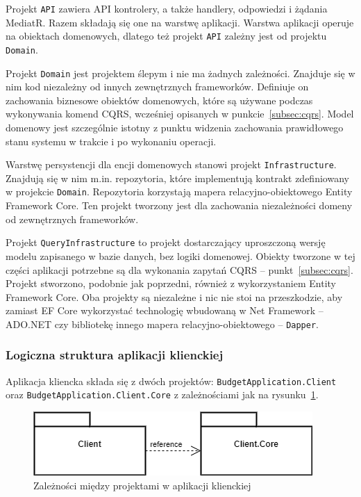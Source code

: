 Projekt \texttt{API} zawiera API kontrolery, a także handlery, odpowiedzi i żądania MediatR. Razem składają się one na warstwę aplikacji. Warstwa aplikacji operuje na obiektach domenowych, dlatego też projekt \texttt{API} zależny jest od projektu \texttt{Domain}.

Projekt \texttt{Domain} jest projektem ślepym i nie ma żadnych zależności. Znajduje się w nim kod niezależny od innych zewnętrznych frameworków. Definiuje on zachowania biznesowe obiektów domenowych, które są używane podczas wykonywania komend CQRS, wcześniej opisanych w punkcie~\ref{subsec:cqrs}. Model domenowy jest szczególnie istotny z punktu widzenia zachowania prawidłowego stanu systemu w trakcie i po wykonaniu operacji.

Warstwę persystencji dla encji domenowych stanowi projekt \texttt{Infrastructure}. Znajdują się w nim m.in. repozytoria, które implementują kontrakt zdefiniowany w projekcie \texttt{Domain}. Repozytoria korzystają mapera relacyjno-obiektowego Entity Framework Core. Ten projekt tworzony jest dla zachowania niezależności domeny od zewnętrznych frameworków.

Projekt \texttt{QueryInfrastructure} to projekt dostarczający uproszczoną wersję modelu zapisanego w bazie danych, bez logiki domenowej. Obiekty tworzone w tej części aplikacji potrzebne są dla wykonania zapytań CQRS -- punkt~\ref{subsec:cqrs}. Projekt stworzono, podobnie jak poprzedni, również z wykorzystaniem Entity Framework Core. Oba projekty są niezależne i nic nie stoi na przeszkodzie, aby zamiast EF Core wykorzystać technologię wbudowaną w Net Framework -- ADO.NET czy bibliotekę innego mapera relacyjno-obiektowego -- \texttt{Dapper}.

\subsubsection{Logiczna struktura aplikacji klienckiej}
Aplikacja kliencka składa się z dwóch projektów: \texttt{BudgetApplication.Client} oraz \texttt{BudgetApplication.Client.Core} z zależnościami jak na rysunku~\ref{fig:client-arch}.
\begin{figure}[ht]
	\centering
	\includegraphics[scale=.55]{rys04/client-arch.png}
	\caption{Zależności między projektami w aplikacji klienckiej}
	\label{fig:client-arch}
\end{figure}

